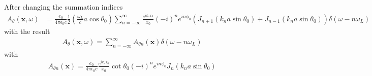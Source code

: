 After changing the summation indices
\begin{align}
    A_\theta({\bm x},\omega) & =\frac{e_0}{4\pi\epsilon_0c}\frac12\left(\frac{\omega_L}ca\cos\theta_0\right)\sum\limits_{n=-\infty}^{\infty}\frac{e^{ik_n x_0}}{x_0}(-i)^{n}e^{in\phi_0}(J_{n+1}(k_na\sin\theta_0)+J_{n-1}(k_na\sin\theta_0))\delta(\omega-n\omega_L)
\end{align}
with the result
\begin{align}
    A_\theta({\bm x},\omega)=\sum\limits_{n=-\infty}^{\infty}A_{\theta n}({\bm x})\delta(\omega-n\omega_L)
\end{align}
with
\begin{align}
    A_{\theta n}({\bm x})=    \frac{e_0}{4\pi\epsilon_0c}\frac{e^{ik_n x_0}}{x_0}\cot\theta_0(-i)^ne^{in\phi_0}J_n(k_na\sin\theta_0)
\end{align}

